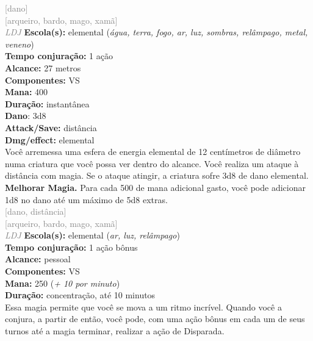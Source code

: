 \documentclass{RPG_Adventure}[2021/10/20]
\begin{document}
{\scriptsize \textcolor{gray}{[dano]\\}}
{\scriptsize \textcolor{gray}{[arqueiro, bardo, mago, xamã]\\}}
{\tiny \textcolor{gray}{\textit{LDJ}}}\jump{}
{\small \t \textbf{Escola(s):} elemental (\textit{água, terra, fogo, ar, luz, sombras, relâmpago, metal, veneno})\\\t \textbf{Tempo conjuração:} 1 ação\\\t \textbf{Alcance:} 27 metros\\\t \textbf{Componentes:} VS\\\t \textbf{Mana:} 400\\\t \textbf{Duração:} instantânea\\\t \textbf{Dano}: 3d8\\\t \textbf{Attack/Save:} distância\\\t \textbf{Dmg/effect:} elemental\\}
{\normalsize Você arremessa uma esfera de energia elemental de 12 centímetros de diâmetro numa criatura que você possa ver dentro do alcance. Você realiza um ataque à distância com magia. Se o ataque atingir, a criatura sofre 3d8 de dano elemental.\\\t \textbf{Melhorar Magia.} Para cada 500 de mana adicional gasto, você pode adicionar 1d8 no dano até um máximo de 5d8 extras.\\}
{\scriptsize \textcolor{gray}{[dano, distância]\\}}
{\scriptsize \textcolor{gray}{[arqueiro, bardo, mago, xamã]\\}}
{\tiny \textcolor{gray}{\textit{LDJ}}}\jump{}
{\small \t \textbf{Escola(s):} elemental (\textit{ar, luz, relâmpago})\\\t \textbf{Tempo conjuração:} 1 ação bônus\\\t \textbf{Alcance:} pessoal\\\t \textbf{Componentes:} VS\\\t \textbf{Mana:} 250 (\textit{+ 10 por minuto})\\\t \textbf{Duração:} concentração, até 10 minutos\\}
{\normalsize Essa magia permite que você se mova a um ritmo incrível. Quando você a conjura, a partir de então, você pode, com uma ação bônus em cada um de seus turnos até a magia terminar, realizar a ação de Disparada.\\}
\end{document}
